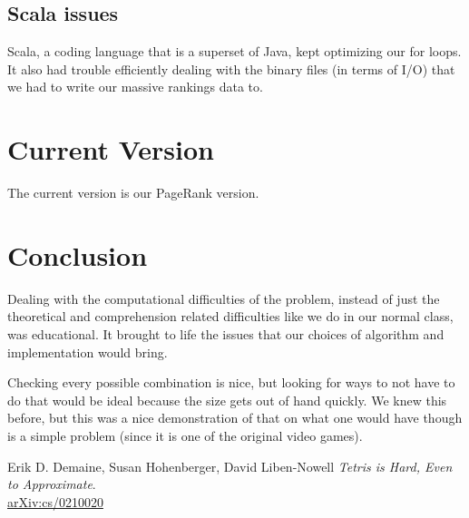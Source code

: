 \documentclass{article}
\begin{document}
\subsection{Scala issues}

\par Scala, a coding language that is a superset of Java, kept optimizing our for loops. It also had trouble efficiently dealing with the binary files (in terms of I/O) that we had to write our massive rankings data to.


\section{Current Version}
\label{sec:current_version}

\par The current version is our PageRank version.


\section{Conclusion}
\label{sec:conclusion}

\par Dealing with the computational difficulties of the problem, instead of just the theoretical and comprehension related difficulties like we do in our normal class, was educational. It brought to life the issues that our choices of algorithm and implementation would bring.

\par Checking every possible combination is nice, but looking for ways to not have to do that would be ideal because the size gets out of hand quickly. We knew this before, but this was a nice demonstration of that on what one would have though is a simple problem (since it is one of the original video games).



\newpage


\begin{thebibliography}{9}
Erik D. Demaine, Susan Hohenberger, David Liben-Nowell
\textit{
Tetris is Hard, Even to Approximate}.
\\\href{https://arxiv.org/abs/cs/0210020}{arXiv:cs/0210020}

\end{thebibliography}
\end{document}
